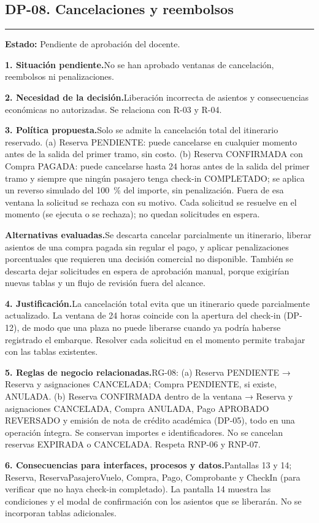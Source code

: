 \documentclass[11pt,a4paper]{article}
\newcommand{\fichacampo}[2]{\noindent\textbf{\color{azulvip}#1}\enspace #2\par\vspace{3pt}}
\begin{document}
\subsection{DP-08. Cancelaciones y reembolsos}
{\color{doradovip}\rule{\textwidth}{.5pt}}
\textbf{Estado:} Pendiente de aprobación del docente.\par\vspace{4pt}
{\normalsize
\fichacampo{1. Situación pendiente.}{No se han aprobado ventanas de cancelación, reembolsos ni penalizaciones.}
\fichacampo{2. Necesidad de la decisión.}{Liberación incorrecta de asientos y consecuencias económicas no autorizadas. Se relaciona con R-03 y R-04.}
\fichacampo{3. Política propuesta.}{Solo se admite la cancelación total del itinerario reservado. (a) Reserva PENDIENTE: puede cancelarse en cualquier momento antes de la salida del primer tramo, sin costo. (b) Reserva CONFIRMADA con Compra PAGADA: puede cancelarse hasta 24 horas antes de la salida del primer tramo y siempre que ningún pasajero tenga check-in COMPLETADO; se aplica un reverso simulado del 100~\% del importe, sin penalización. Fuera de esa ventana la solicitud se rechaza con su motivo. Cada solicitud se resuelve en el momento (se ejecuta o se rechaza); no quedan solicitudes en espera.}
\fichacampo{Alternativas evaluadas.}{Se descarta cancelar parcialmente un itinerario, liberar asientos de una compra pagada sin regular el pago, y aplicar penalizaciones porcentuales que requieren una decisión comercial no disponible. También se descarta dejar solicitudes en espera de aprobación manual, porque exigirían nuevas tablas y un flujo de revisión fuera del alcance.}
\fichacampo{4. Justificación.}{La cancelación total evita que un itinerario quede parcialmente actualizado. La ventana de 24 horas coincide con la apertura del check-in (DP-12), de modo que una plaza no puede liberarse cuando ya podría haberse registrado el embarque. Resolver cada solicitud en el momento permite trabajar con las tablas existentes.}
\fichacampo{5. Reglas de negocio relacionadas.}{RG-08: (a) Reserva PENDIENTE → Reserva y asignaciones CANCELADA; Compra PENDIENTE, si existe, ANULADA. (b) Reserva CONFIRMADA dentro de la ventana → Reserva y asignaciones CANCELADA, Compra ANULADA, Pago APROBADO REVERSADO y emisión de nota de crédito académica (DP-05), todo en una operación íntegra. Se conservan importes e identificadores. No se cancelan reservas EXPIRADA o CANCELADA. Respeta RNP-06 y RNP-07.}
\fichacampo{6. Consecuencias para interfaces, procesos y datos.}{Pantallas 13 y 14; Reserva, ReservaPasajeroVuelo, Compra, Pago, Comprobante y CheckIn (para verificar que no haya check-in completado). La pantalla 14 muestra las condiciones y el modal de confirmación con los asientos que se liberarán. No se incorporan tablas adicionales.}
}
\end{document}

